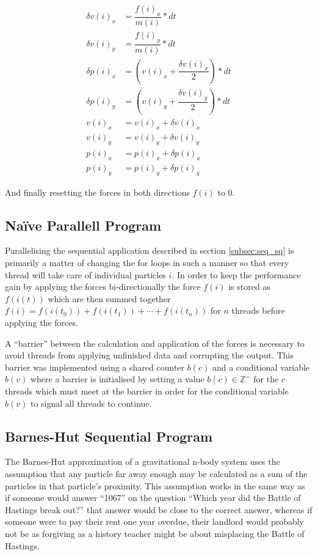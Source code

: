\documentclass[titlepage,a4paper,12pt]{article}
\begin{document}
\begin{align}
\delta v(i)_x &= \dfrac{f(i)_x}{m(i)} * dt\\
\delta v(i)_y &= \dfrac{f(i)_y}{m(i)} * dt\\
\delta p(i)_x &= (v(i)_x + \dfrac{\delta v(i)_x}{2}) * dt \\
\delta p(i)_y &= (v(i)_y + \dfrac{\delta v(i)_y}{2}) * dt \\
v(i)_x &= v(i)_x + \delta v(i)_x\\
v(i)_y &= v(i)_y + \delta v(i)_y\\
p(i)_x &= p(i)_x + \delta p(i)_x\\
p(i)_y &= p(i)_y + \delta p(i)_y
\end{align}

And finally resetting the forces in both directions $f(i)$ to $0$.

\subsection{Na\"{i}ve Parallell Program}
\label{subsec:par_sq}
Parallelising the sequential application described in section
\ref{subsec:seq_sq} is primarily a matter of changing the for loops in such a
manner so that every thread will take care of individual particles $i$. In
order to keep the performance gain by applying the forces bi-directionally
the force $f(i)$ is stored as $f(i(t))$ which are then summed together 
$f(i) = f(i(t_0)) + f(i(t_1)) + \cdots + f(i(t_n))$ for $n$ threads before
applying the forces.

A ``barrier'' between the calculation and application of the forces is necessary
to avoid threads from applying unfinished data and corrupting the output. This
barrier was implemented using a shared counter $b(c)$ and a conditional variable
$b(v)$ where a barrier is initialised by setting a value $b(c) \in \mathbb{Z}^+$
for the $c$ threads which must meet at the barrier in order for the conditional
variable $b(v)$ to signal all threads to continue.

\subsection{Barnes-Hut Sequential Program}
\label{subsec:seq_nlg}

The Barnes-Hut approximation of a gravitational n-body system uses the
assumption that any particle far away enough may be calculated as a sum
of the particles in that particle's proximity. This assumption works in the same
way as if someone would answer ``1067'' on the question ``Which year did the 
Battle of Hastings break out?'' that answer would be close to the correct
answer, whereas if someone were to pay their rent one year overdue, their
landlord would probably not be as forgiving as a history teacher might be
about misplacing the Battle of Hastings.
\end{document}
